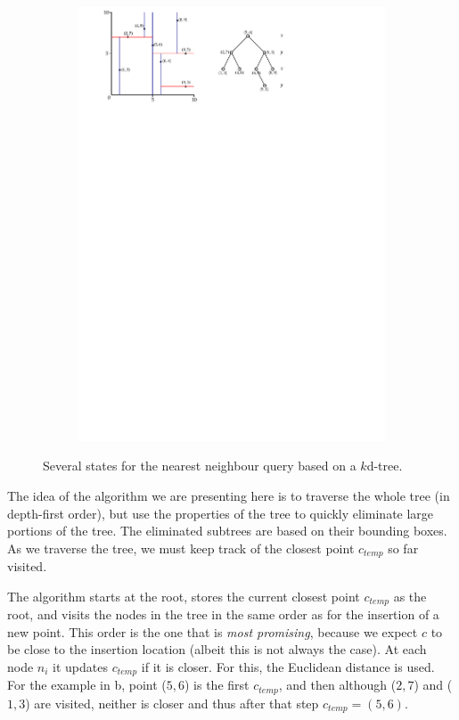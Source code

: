 \begin{figure}
\begin{subfigure}[b]{0.6\linewidth}
    \includegraphics[page=5,width=\textwidth]{figs/kdtree_nn.pdf}
    \caption{}
  \end{subfigure}
\caption{Several states for the nearest neighbour query based on a $k$d-tree.}%
\end{figure}


%

The idea of the algorithm we are presenting here is to traverse the whole tree (in depth-first order), but use the properties of the tree to quickly eliminate large portions of the tree.
The eliminated subtrees are based on their bounding boxes.
As we traverse the tree, we must keep track of the closest point $c_{temp}$ so far visited.


The algorithm starts at the root, stores the current closest point $c_{temp}$ as the root, and visits the nodes in the tree in the same order as for the insertion of a new point.
This order is the one that is \emph{most promising}, because we expect $c$ to be close to the insertion location (albeit this is not always the case).
At each node $n_i$ it updates $c_{temp}$ if it is closer.
For this, the Euclidean distance is used.
For the example in b, point ($5,6$) is the first $c_{temp}$, and then although ($2,7$) and ($1,3$) are visited, neither is closer and thus after that step $c_{temp} = (5,6)$.

